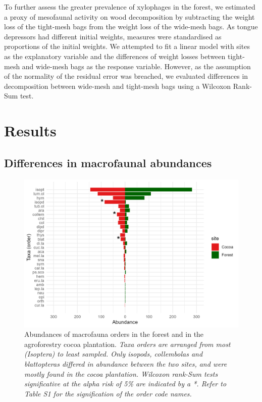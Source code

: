 \documentclass[fleqn,10pt]{ArtEcoFoG} %
\begin{document}
To further assess the greater prevalence of xylophages in the forest, we estimated a proxy of mesofaunal activity on wood decomposition by subtracting the weight loss of the tight-mesh bags from the weight loss of the wide-mesh bags. As tongue depressors had different initial weights, measures were standardised as proportions of the initial weights. We attempted to fit a linear model with sites as the explanatory variable and the differences of weight losses between tight-mesh and wide-mesh bags as the response variable. However, as the assumption of the normality of the residual error was breached, we evaluated differences in decomposition between wide-mesh and tight-mesh bags using a Wilcoxon Rank-Sum test.

\section{Results}\label{results}

\subsection{Differences in macrofaunal abundances}\label{differences-in-macrofaunal-abundances}

\scriptsize

\begin{figure}

{\centering \includegraphics[width=0.8\linewidth,]{rapport_files/figure-latex/abundance-1} 

}

\caption{Abundances of macrofauna orders in the forest and in the agroforestry cocoa plantation. \textit{Taxa orders are arranged from most (Isoptera) to least sampled. Only isopods, collembolas and blattopteras differed in abundance between the two sites, and were mostly found in the cocoa plantation. Wilcoxon rank-Sum tests significative at the alpha risk of 5\% are indicated by a *.  Refer to Table S1 for the signification of the order code names.}}\label{fig:abundance}
\end{figure}
\end{document}
